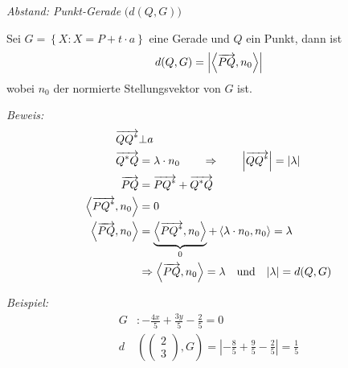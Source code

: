 \begin{mylemma}\textit{Abstand: Punkt-Gerade} $\big( d(Q,G) \big)$\\

    \begin{minipage}{0.6\textwidth}
        Sei $G = \left\{ X : X = P+t \cdot a \right\}$ eine Gerade und $Q$ ein Punkt, dann ist
        \begin{align*}
            d(Q,G) = \left| \left\langle \overrightarrow{PQ} , n_0 \right\rangle \right|
        \end{align*}
        wobei $n_0$ der normierte Stellungsvektor von $G$ ist.
    \end{minipage}
    \begin{minipage}{0.4\textwidth}
        \begin{center}
        \end{center}
    \end{minipage}

    \textit{Beweis:}
    \begin{align*}
        \overrightarrow{QQ^*} & \bot a\\
        \overrightarrow{Q^*Q} & = \lambda \cdot n_0 \qquad \Rightarrow \qquad \left| \overrightarrow{QQ^*} \right| = \left| \lambda \right|\\
        \overrightarrow{PQ} & = \overrightarrow{PQ^*}  + \overrightarrow{Q^*Q}\\
        \left\langle \overrightarrow{PQ^*} , n_0 \right\rangle & = 0\\
        \left\langle \overrightarrow{PQ} , n_0 \right\rangle & = \underbrace{\left\langle \overrightarrow{PQ^*} , n_0 \right\rangle}_{0} + \left\langle \lambda \cdot n_0, n_0 \right\rangle = \lambda\\
        & \Rightarrow \left\langle \overrightarrow{PQ} , n_0 \right\rangle = \lambda \quad \text{und} \quad |\lambda| = d(Q,G)
    \end{align*}
\end{mylemma}
\textit{Beispiel:}
\begin{align*}
    G & : -\frac{4x}{5} + \frac{3y}{5} - \frac{2}{5} = 0\\
    d & \left(
    \begin{pmatrix}
        2\\3
    \end{pmatrix}
    ,G
    \right)
    =
    \left| -\frac{8}{5} + \frac{9}{5} - \frac{2}{5}  \right| = \frac{1}{5}
\end{align*}

